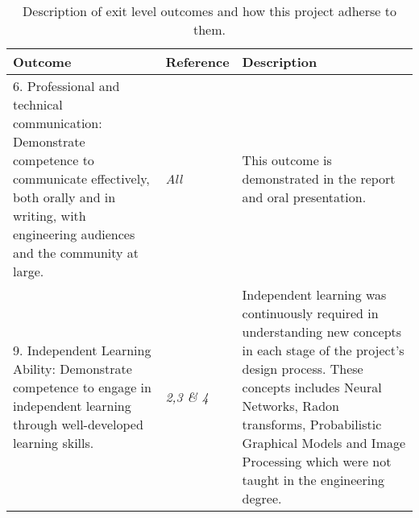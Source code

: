 \begin{table}
\caption{Description of exit level outcomes and how this project adherse to them.} \label{tbl:ECSATable2}
\begin{tabular}{|p{6cm}|p{3cm}|p{6cm}|}
\hline
\textbf{Outcome}&\textbf{Reference}&\textbf{Description}\\
\hline
6. Professional and technical communication: Demonstrate competence to communicate effectively, both orally and
in writing, with engineering audiences and the community at large.&\textit{All}&This outcome is demonstrated in the report and oral presentation.\\
\hline
9. Independent Learning Ability: Demonstrate competence to engage in independent learning through well-developed
learning skills.&\textit{2,3 \& 4}&Independent learning was continuously required in understanding new concepts in each stage of the project's design process. These concepts includes Neural Networks, Radon transforms, Probabilistic Graphical Models and Image Processing which were not taught in the engineering degree.\\
\hline
\end{tabular}
\end{table}
